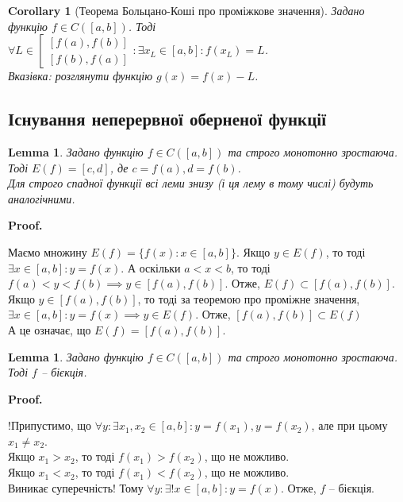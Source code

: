 \documentclass[a4paper, 14pt]{article}
\makeatletter
\def\qed{$\blacksquare$}
\theoremstyle{theoremdd}
\theoremstyle{theoremdd}
\theoremstyle{theoremdd}
\theoremstyle{theoremdd}
\theoremstyle{theoremdd}
\theoremstyle{theoremdd}
\theoremstyle{theoremdd}
\newtheorem{lemma}[theorem]{Lemma}
\theoremstyle{theoremdd}
\newtheorem{corollary}[theorem]{Corollary}
\renewenvironment{proof}[1][Proof.\\]{\par
\pushQED{\hfill \qed}%
\normalfont \topsep6\p@\@plus6\p@\relax
\trivlist
\item\relax
{\bfseries
#1\@addpunct{.}}\hspace\labelsep\ignorespaces
}{%
\popQED\endtrivlist\@endpefalse
}
\makeatother
\begin{document}
\begin{corollary}[Теорема Больцано-Коші про проміжкове значення]
Задано функцію $f \in C([a,b])$.
Тоді $\forall L \in \left[ \begin{gathered}  \left[f(a),f(b) \right] \\ \left[f(b),f(a) \right] \end{gathered} \right.: \exists x_L \in [a,b]: f(x_L) = L$.\\
\textit{Вказівка: розглянути функцію $g(x) = f(x) - L$.}
\end{corollary}

\subsection{Існування неперервної оберненої функції}
\begin{lemma}
Задано функцію $f \in C([a,b])$ та строго монотонно зростаюча. Тоді $E(f) = [c,d]$, де $c = f(a), d = f(b)$.\\
\textit{Для строго спадної функції всі леми знизу (і ця лему в тому числі) будуть аналогічними.}
\end{lemma}

\begin{proof}
Маємо множину $E(f) = \{f(x): x \in [a,b] \}$.
Якщо $y \in E(f)$, то тоді $\exists x \in [a,b]: y = f(x)$. А оскільки $a < x < b$, то тоді $f(a) < y < f(b) \implies y \in [f(a),f(b)]$. Отже, $E(f) \subset [f(a),f(b)]$.\\
Якщо $y \in [f(a),f(b)]$, то тоді за теоремою про проміжне значення, $\exists x \in [a,b]: y = f(x) \implies y \in E(f)$. Отже, $[f(a),f(b)] \subset E(f)$\\
А це означає, що $E(f) = [f(a),f(b)]$.
\end{proof}

\begin{lemma}
Задано функцію $f \in C([a,b])$ та строго монотонно зростаюча. Тоді $f$ -- бієкція.
\end{lemma}

\begin{proof}
!Припустимо, що $\forall y: \exists x_1,x_2 \in [a,b]: y = f(x_1), y = f(x_2)$, але при цьому $x_1 \neq x_2$.\\
Якщо $x_1 > x_2$, то тоді $f(x_1) > f(x_2)$, що не можливо.\\
Якщо $x_1 < x_2$, то тоді $f(x_1) < f(x_2)$, що не можливо.\\
Виникає суперечність! Тому $\forall y: \exists! x \in [a,b]: y = f(x)$. Отже, $f$ -- бієкція.
\end{proof}
\end{document}
